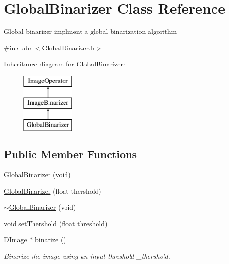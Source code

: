 \hypertarget{class_global_binarizer}{\section{Global\+Binarizer Class Reference}
\label{class_global_binarizer}
}


Global binarizer implment a global binarization algorithm  




{\ttfamily \#include $<$Global\+Binarizer.\+h$>$}

Inheritance diagram for Global\+Binarizer\+:\begin{figure}[H]
\begin{center}
\leavevmode
\includegraphics[height=3.000000cm]{class_global_binarizer}
\end{center}
\end{figure}
\subsection*{Public Member Functions}
\begin{DoxyCompactItemize}
\item 
\hyperlink{class_global_binarizer_a50bbd8c67da42e27dcecfcbacfa1189d}{Global\+Binarizer} (void)
\item 
\hyperlink{class_global_binarizer_a737f40337f87b8dc84f75aff325ee748}{Global\+Binarizer} (float thershold)
\item 
\hyperlink{class_global_binarizer_ad5f62437210fb6c174db58456b09c632}{$\sim$\+Global\+Binarizer} (void)
\item 
void \hyperlink{class_global_binarizer_a68d1645debe43e1142b922b7206e6b28}{set\+Thershold} (float threshold)
\item 
\hyperlink{class_d_image}{D\+Image} $\ast$ \hyperlink{class_global_binarizer_ad553b71737ff73e4ec06ccc52ba01b25}{binarize} ()
\begin{DoxyCompactList}\small\item\em Binarize the image using an input threshold \+\_\+thershold. \end{DoxyCompactList}\end{DoxyCompactItemize}
